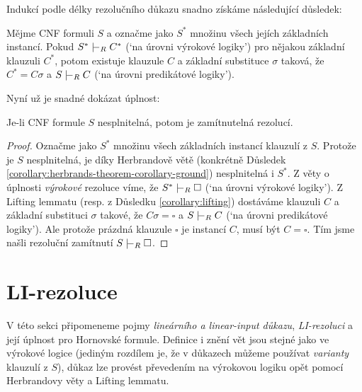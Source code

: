 Indukcí podle délky rezolučního důkazu snadno získáme následující důsledek:

\begin{corollary}\label{corollary:lifting}
Mějme CNF formuli $S$ a označme jako $S^*$ množinu všech jejích základních instancí. Pokud $S^*\proves_R C^*$ (`na úrovni výrokové logiky') pro nějakou základní klauzuli $C^*$, potom existuje klauzule $C$ a základní substituce $\sigma$ taková, že $C^*=C\sigma$ a $S\proves_R C$ (`na úrovni predikátové logiky').
\end{corollary}

Nyní už je snadné dokázat úplnost:

\begin{theorem}\label{theorem:completeness-of-predicate-resolution}
    Je-li CNF formule $S$ nesplnitelná, potom je zamítnutelná rezolucí.
\end{theorem}
\begin{proof}
Označme jako $S^*$ množinu všech základních instancí klauzulí z $S$. Protože je $S$ nesplnitelná, je díky Herbrandově větě (konkrétně Důsledek \ref{corollary:herbrands-theorem-corollary-ground}) nesplnitelná i $S^*$. Z věty o úplnosti \emph{výrokové} rezoluce víme, že $S^*\proves_R\square$ (`na úrovni výrokové logiky'). Z Lifting lemmatu (resp. z Důsledku \ref{corollary:lifting}) dostáváme klauzuli $C$ a základní substituci $\sigma$ takové, že $C\sigma=\square$ a $S\proves_R C$ (`na úrovni predikátové logiky'). Ale protože prázdná klauzule $\square$ je instancí $C$, musí být $C=\square$. Tím jsme našli rezoluční zamítnutí $S\proves_R \square$.
\end{proof}


\section{LI-rezoluce}\label{section:predicate-LI-resolution}

V této sekci připomeneme pojmy \emph{lineárního a linear-input důkazu}, \emph{LI-rezoluci} a její úplnost pro Hornovské formule. Definice i znění vět jsou stejné jako ve výrokové logice (jediným rozdílem je, že v důkazech můžeme používat \emph{varianty} klauzulí z $S$), důkaz lze provést převedením na výrokovou logiku opět pomocí Herbrandovy věty a Lifting lemmatu.

